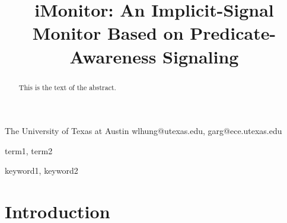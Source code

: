 \documentclass[preprint]{sigplanconf}
\begin{document}
\copyrightdata{[to be supplied]} 


\title{iMonitor: An Implicit-Signal Monitor Based on Predicate-Awareness 
Signaling}
\subtitle{}

           {The University of Texas at Austin}
           {wlhung@utexas.edu, garg@ece.utexas.edu}

\maketitle

\begin{abstract}
This is the text of the abstract.
\end{abstract}


\terms
term1, term2

\keywords
keyword1, keyword2








\section{Introduction} \label{sec:intro}
\end{document}
